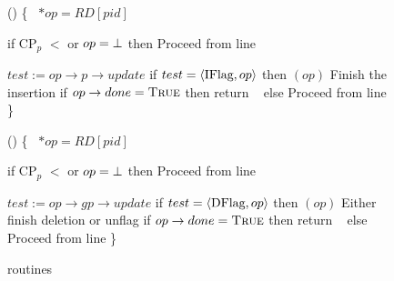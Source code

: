 \begin{figure}[H]
	\footnotesize
	\color{blue} {
	\begin{code}
		
		\firstline
		() \{ \nlc \n
		\IFlag\ $*op = RD[pid]$ \bl \nlc
		
		if $\text{CP}_p$ $<$  or $op = \mbox{$\bot$}$ then \label{BSTinsert-recover-read-CP} \nlc \n
			Proceed from line  \nlc \p

		$test := op\rightarrow p\rightarrow update$ \nlc
		if $test = \langle \mbox{IFlag},op \rangle$ then $(op)$ \tabtabcom Finish the insertion \nlc
		if $op\rightarrow done = \mbox{\sc True}$ then return \TRUE\ \nlc
		else Proceed from line  \nlc
		\p \} \bl \nlc
		
		
		() \{ \nlc \n
		\DFlag\ $*op = RD[pid]$ \bl \nlc
		
		if $\text{CP}_p$ $<$  or $op = \mbox{$\bot$}$ then \label{BSTdelete-recover-read-CP} \nlc \n
		Proceed from line  \nlc \p
		
		$test := op\rightarrow gp\rightarrow update$ \nlc
		if $test = \langle \mbox{DFlag}, op \rangle$ then $(op)$ \tabtabcom Either finish deletion or unflag \nlc
		if $op\rightarrow done = \mbox{\sc True}$ then return \TRUE\ \nlc
		else Proceed from line  \nlc
		\p \}
	
	\end{code}
}
	\caption{ routines}
\end{figure}



